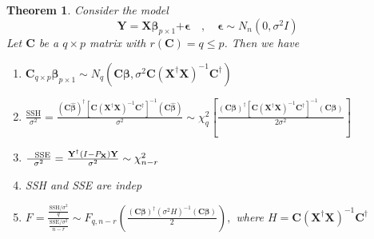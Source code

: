 \documentclass{article}
\newtheorem{theorem}{Theorem}
\begin{document}
\begin{theorem}
Consider the model%
\begin{equation*}
\mathbf{Y=X\beta }_{p\times 1}\mathbf{+\epsilon \quad ,\quad \epsilon }\sim
N_{n}\left( 0,\sigma ^{2}I\right)
\end{equation*}%
Let $\mathbf{C}$ be a $q\times p$ matrix with $r\left( \mathbf{C}\right)
=q\leq p$. Then we have

\begin{enumerate}
\item $\mathbf{C}_{q\times p}\mathbf{\hat{\beta}}_{p\times 1}\sim
N_{q}\left( \mathbf{C\beta },\sigma ^{2}\mathbf{C}\left( \mathbf{X}^{\dagger
}\mathbf{X}\right) ^{-1}\mathbf{C}^{\dagger }\right) $

\item $\frac{\text{SSH}}{\sigma ^{2}}=\frac{\left( \mathbf{C\hat{\beta}}%
\right) ^{\dagger }\left[ \mathbf{C}\left( \mathbf{X}^{\dagger }\mathbf{X}%
\right) ^{-1}\mathbf{C}^{\dagger }\right] ^{-1}\left( \mathbf{C\hat{\beta}}%
\right) }{\sigma ^{2}}\sim \chi _{q}^{2}\left[ \frac{\left( \mathbf{C\beta }%
\right) ^{\dagger }\left[ \mathbf{C}\left( \mathbf{X}^{\dagger }\mathbf{X}%
\right) ^{-1}\mathbf{C}^{\dagger }\right] ^{-1}\left( \mathbf{C\beta }%
\right) }{2\sigma ^{2}}\right] $

\item $\frac{\text{SSE}}{\sigma ^{2}}=\frac{\mathbf{Y}^{\dagger }\left( I-P_{%
\mathbf{X}}\right) \mathbf{Y}}{\sigma ^{2}}\sim \chi _{n-r}^{2}$

\item SSH and SSE are indep

\item $F=\frac{\frac{\text{SSH}/\sigma ^{2}}{q}}{\frac{\text{SSE}/\sigma ^{2}%
}{n-r}}\sim F_{q,n-r}\left( \frac{\left( \mathbf{C\beta }\right) ^{\dagger
}\left( \sigma ^{2}H\right) ^{-1}\left( \mathbf{C\beta }\right) }{2}\right)
, $ where $H=\mathbf{C}\left( \mathbf{X}^{\dagger }\mathbf{X}\right) ^{-1}%
\mathbf{C}^{\dagger }$
\end{enumerate}
\end{theorem}

\bigskip
\end{document}
